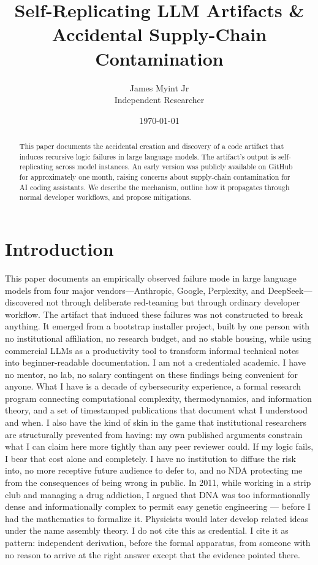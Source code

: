 \documentclass[11pt]{article}
\title{Self-Replicating LLM Artifacts \& Accidental Supply-Chain Contamination}
\author{James Myint Jr\\Independent Researcher}
\date{\today}
\begin{document}
\maketitle

\begin{abstract}
This paper documents the accidental creation and discovery of a code artifact that induces recursive logic failures in large language models. The artifact’s output is self-replicating across model instances. An early version was publicly available on GitHub for approximately one month, raising concerns about supply-chain contamination for AI coding assistants. We describe the mechanism, outline how it propagates through normal developer workflows, and propose mitigations.
\end{abstract}

\section{Introduction}
This paper documents an empirically observed failure mode in large language models from four major vendors—Anthropic, Google, Perplexity, and DeepSeek—discovered not through deliberate red-teaming but through ordinary developer workflow. The artifact that induced these failures was not constructed to break anything. It emerged from a bootstrap installer project, built by one person with no institutional affiliation, no research budget, and no stable housing, while using commercial LLMs as a productivity tool to transform informal technical notes into beginner-readable documentation.
I am not a credentialed academic. I have no mentor, no lab, no salary contingent on these findings being convenient for anyone. What I have is a decade of cybersecurity experience, a formal research program connecting computational complexity, thermodynamics, and information theory, and a set of timestamped publications that document what I understood and when. I also have the kind of skin in the game that institutional researchers are structurally prevented from having: my own published arguments constrain what I can claim here more tightly than any peer reviewer could. If my logic fails, I bear that cost alone and completely. I have no institution to diffuse the risk into, no more receptive future audience to defer to, and no NDA protecting me from the consequences of being wrong in public.
In 2011, while working in a strip club and managing a drug addiction, I argued that DNA was too informationally dense and informationally complex to permit easy genetic engineering — before I had the mathematics to formalize it. Physicists would later develop related ideas under the name assembly theory. I do not cite this as credential. I cite it as pattern: independent derivation, before the formal apparatus, from someone with no reason to arrive at the right answer except that the evidence pointed there.
\end{document}
